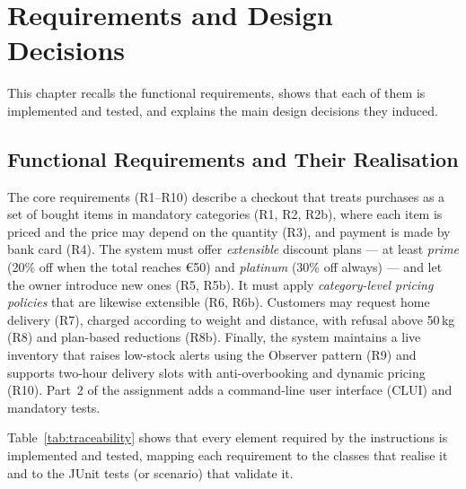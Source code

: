\chapter{Requirements and Design Decisions}
\label{ch:requirements}

This chapter recalls the functional requirements, shows that each of them is
implemented and tested, and explains the main design decisions they induced.

\section{Functional Requirements and Their Realisation}
The core requirements (R1--R10) describe a checkout that treats purchases as a
set of bought items in mandatory categories (R1, R2, R2b), where each item is
priced and the price may depend on the quantity (R3), and payment is made by
bank card (R4). The system must offer \emph{extensible} discount plans --- at
least \emph{prime} (20\% off when the total reaches \euro{}50) and \emph{platinum}
(30\% off always) --- and let the owner introduce new ones (R5, R5b). It must
apply \emph{category-level pricing policies} that are likewise extensible (R6,
R6b). Customers may request home delivery (R7), charged according to weight and
distance, with refusal above 50\,kg (R8) and plan-based reductions (R8b).
Finally, the system maintains a live inventory that raises low-stock alerts
using the Observer pattern (R9) and supports two-hour delivery slots with
anti-overbooking and dynamic pricing (R10). Part~2 of the assignment adds a
command-line user interface (CLUI) and mandatory tests.

Table~\ref{tab:traceability} shows that every element required by the
instructions is implemented and tested, mapping each requirement to the classes
that realise it and to the JUnit tests (or scenario) that validate it.

